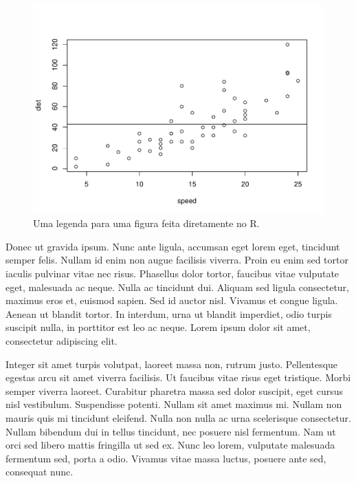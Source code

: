 \documentclass[book,A4paper,10pt,twoside,oldfontcommands]{memoir}\usepackage[]{graphicx}\usepackage[usenames,dvipsnames]{color}
\newenvironment{knitrout}{}{} %
\begin{document}
\begin{knitrout}
\color{fgcolor}\begin{figure}[!htb]

{\centering \includegraphics[width=0.8\linewidth]{figuras/xyplot-1} 

}

\caption[Uma legenda para uma figura feita diretamente no R]{Uma legenda para uma figura feita diretamente no R.}\label{fig:xyplot}
\end{figure}


\end{knitrout}

Donec ut gravida ipsum. Nunc ante ligula, accumsan eget lorem eget,
tincidunt semper felis. Nullam id enim non augue facilisis viverra.
Proin eu enim sed tortor iaculis pulvinar vitae nec risus. Phasellus
dolor tortor, faucibus vitae vulputate eget, malesuada ac neque. Nulla
ac tincidunt dui. Aliquam sed ligula consectetur, maximus eros et,
euismod sapien. Sed id auctor nisl. Vivamus et congue ligula. Aenean
ut blandit tortor. In interdum, urna ut blandit imperdiet, odio turpis
suscipit nulla, in porttitor est leo ac neque. Lorem ipsum dolor sit
amet, consectetur adipiscing elit.

Integer sit amet turpis volutpat, laoreet massa non, rutrum justo.
Pellentesque egestas arcu sit amet viverra facilisis. Ut faucibus
vitae risus eget tristique. Morbi semper viverra laoreet. Curabitur
pharetra massa sed dolor suscipit, eget cursus nisl vestibulum.
Suspendisse potenti. Nullam sit amet maximus mi. Nullam non mauris
quis mi tincidunt eleifend. Nulla non nulla ac urna scelerisque
consectetur. Nullam bibendum dui in tellus tincidunt, nec posuere nisl
fermentum. Nam ut orci sed libero mattis fringilla ut sed ex. Nunc leo
lorem, vulputate malesuada fermentum sed, porta a odio. Vivamus vitae
massa luctus, posuere ante sed, consequat nunc.
\end{document}
